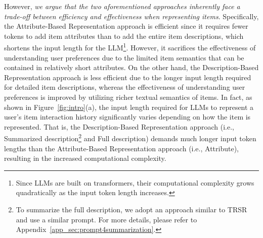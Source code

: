 \documentclass[sigconf]{acmart}
\begin{document}
However, \textit{we argue that the two aforementioned approaches inherently face a trade-off between efficiency and effectiveness when representing items}. Specifically, the
Attribute-Based Representation approach is efficient since it requires fewer tokens to add item attributes than to add the entire item descriptions, which shortens the input length for the LLM\footnote{Since LLMs are built on transformers, their computational complexity grows quadratically as the input token length increases.}. However, it sacrifices the effectiveness of understanding user preferences due to the limited item semantics that can be contained in relatively short attributes. On the other hand, the 
Description-Based Representation approach is less efficient due to the longer input length required for detailed item descriptions, whereas the effectiveness of understanding user preferences is improved by utilizing richer textual semantics of items. 
In fact, as shown in Figure~\ref{fig:intro}(a), the input length required for LLMs to represent a user's item interaction history significantly varies depending on how the item is represented. That is, the Description-Based Representation approach (i.e., Summarized description\footnote{To summarize the full description, we adopt an approach similar to TRSR \cite{zheng2024harnessing} and use a similar prompt. For more details, please refer to Appendix~\ref{app_sec:prompt4summarization}.} and Full description) demands much longer input token lengths than the Attribute-Based Representation approach (i.e., Attribute), resulting in the increased computational complexity.
\end{document}
